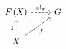 \documentclass{article}
\begin{document}
    \begin{equation*}
        \begin{tikzcd}
            F\l(X\r) \ar[r, "\ex!\phi", dashed] & G \\
            X \ar[u, "j"] \ar[ur, "f"']
        \end{tikzcd}
    \end{equation*}
\end{document}
